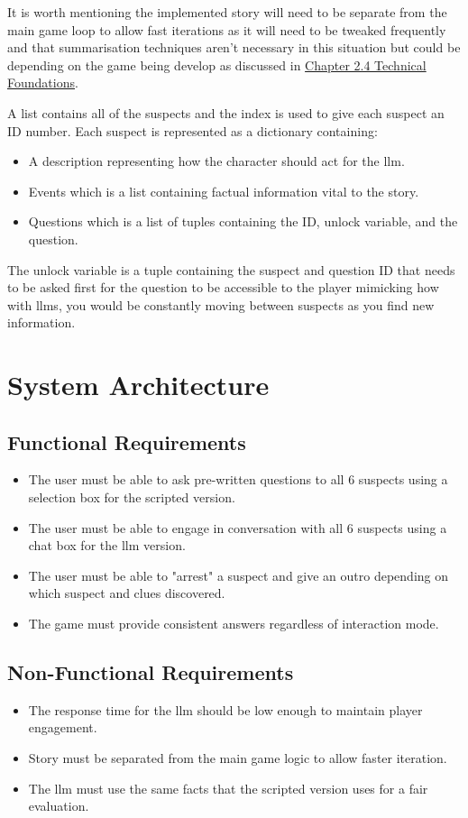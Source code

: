 \documentclass[12pt, a4paper]{report}
\begin{document}
	It is worth mentioning the implemented story will need to be separate from the main game loop to allow fast iterations as it will need to be tweaked frequently and that summarisation techniques aren't necessary in this situation but could be depending on the game being develop as discussed in \hyperref[section:technicalfoundations]{Chapter 2.4 Technical Foundations}.
	
	A list contains all of the suspects and the index is used to give each suspect an ID number. Each suspect is represented as a dictionary containing:

	\begin{itemize}
		\item A description representing how the character should act for the \gls{llm}.
		\item Events which is a list containing factual information vital to the story.
		\item Questions which is a list of tuples containing the ID, unlock variable, and the question.
	\end{itemize}
	
	The unlock variable is a tuple containing the suspect and question ID that needs to be asked first for the question to be accessible to the player mimicking how with \gls{llm}s, you would be constantly moving  between suspects as you find new information.
	
	\section{System Architecture}
	\subsection{Functional Requirements}
	\begin{itemize}
		\item The user must be able to ask pre-written questions to all 6 suspects using a selection box for the scripted version.
		\item The user must be able to engage in conversation with all 6 suspects using a chat box for the \gls{llm} version.
		\item The user must be able to "arrest" a suspect and give an outro depending on which suspect and clues discovered.
		\item The game must provide consistent answers regardless of interaction mode.
	\end{itemize}
	
	\subsection{Non-Functional Requirements}
	\begin{itemize}
		\item The response time for the \gls{llm} should be low enough to maintain player engagement.
		\item Story must be separated from the main game logic to allow faster iteration.
		\item The \gls{llm} must use the same facts that the scripted version uses for a fair evaluation.
	\end{itemize}
	
\end{document}
